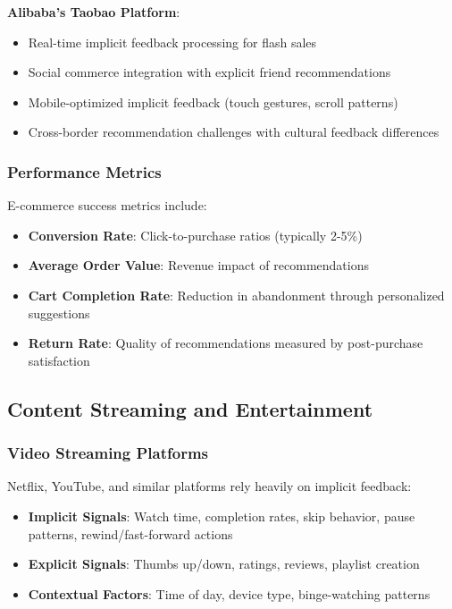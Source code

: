 \textbf{Alibaba's Taobao Platform}:
\begin{itemize}
    \item Real-time implicit feedback processing for flash sales
    \item Social commerce integration with explicit friend recommendations
    \item Mobile-optimized implicit feedback (touch gestures, scroll patterns)
    \item Cross-border recommendation challenges with cultural feedback differences
\end{itemize}

\subsubsection{Performance Metrics}

E-commerce success metrics include:
\begin{itemize}
    \item \textbf{Conversion Rate}: Click-to-purchase ratios (typically 2-5\%)
    \item \textbf{Average Order Value}: Revenue impact of recommendations
    \item \textbf{Cart Completion Rate}: Reduction in abandonment through personalized suggestions
    \item \textbf{Return Rate}: Quality of recommendations measured by post-purchase satisfaction
\end{itemize}

\subsection{Content Streaming and Entertainment}

\subsubsection{Video Streaming Platforms}

Netflix, YouTube, and similar platforms rely heavily on implicit feedback:

\begin{itemize}
    \item \textbf{Implicit Signals}: Watch time, completion rates, skip behavior, pause patterns, rewind/fast-forward actions
    \item \textbf{Explicit Signals}: Thumbs up/down, ratings, reviews, playlist creation
    \item \textbf{Contextual Factors}: Time of day, device type, binge-watching patterns
\end{itemize}

